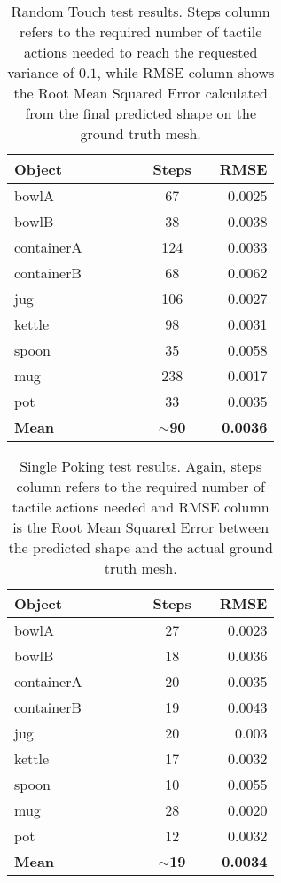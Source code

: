 \begin{table}
    \centering
    \begin{tabularx}{0.95\columnwidth}{lccccccr}
        \toprule
        Object &&& & & Steps && RMSE \\
        \midrule
        bowlA &&& & &67 && 0.0025\\
        bowlB &&& & &38 && 0.0038\\
        containerA &&&&& 124 && 0.0033\\
        containerB &&&&& 68 && 0.0062\\
        jug &&&&& 106 && 0.0027\\
        kettle &&&&& 98 && 0.0031\\
        spoon &&&&& 35 && 0.0058\\
        mug &&&&& 238 && 0.0017\\
        pot &&&&& 33 && 0.0035\\
        \midrule
        \textbf{Mean} &&&&& $\sim$\textbf{90} && \textbf{0.0036}\\
        \bottomrule
    \end{tabularx}
    \caption{Random Touch test results. Steps column refers to the required number of
    tactile actions needed to reach the requested variance of $0.1$, while RMSE column shows
the Root Mean Squared Error calculated from the final predicted shape on the ground truth mesh.}
    \label{tab:test1}
\end{table}
\begin{table}
    \centering
    \begin{tabularx}{0.95\columnwidth}{lccccccr}
        \toprule
        Object &&& & & Steps && RMSE \\
        \midrule
        bowlA &&& & &27 && 0.0023\\
        bowlB &&& & &18 && 0.0036\\
        containerA &&&&& 20 && 0.0035\\
        containerB &&&&& 19 && 0.0043\\
        jug &&&&& 20 && 0.003\\
        kettle &&&&& 17 && 0.0032\\
        spoon &&&&& 10 && 0.0055\\
        mug &&&&& 28 && 0.0020\\
        pot &&&&& 12 && 0.0032\\
        \midrule
        \textbf{Mean} &&&&& $\sim$\textbf{19} && \textbf{0.0034}\\
        \bottomrule
    \end{tabularx}
    \caption{Single Poking test results. Again, steps column refers to the required
    number of tactile actions needed and RMSE column is the Root Mean Squared Error between
    the predicted shape and the actual ground truth mesh.}
    \label{tab:test2}
\end{table}
